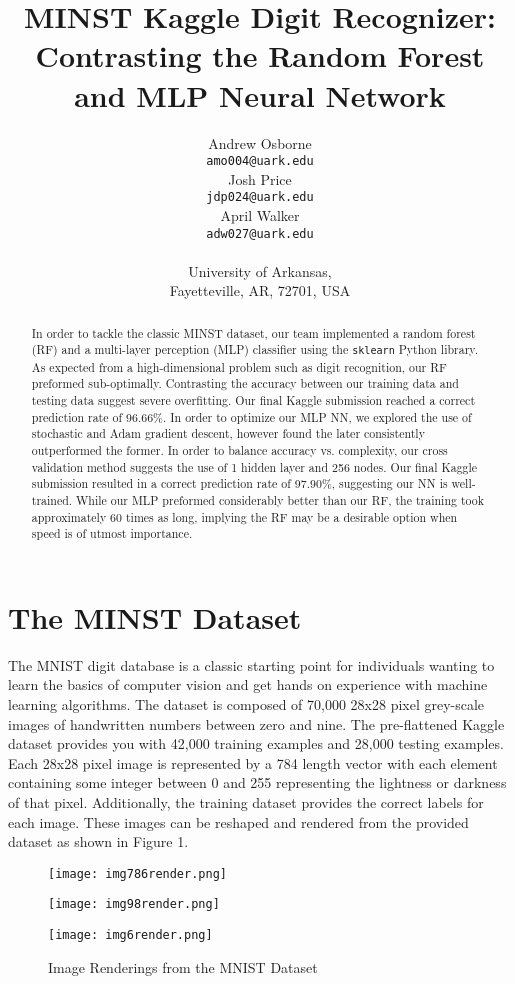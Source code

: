 \documentclass{article}
\title{MINST Kaggle Digit Recognizer: Contrasting the Random Forest and MLP Neural Network}
\author{%
   Andrew Osborne \\
   \texttt{amo004@uark.edu} \\
   \And
   Josh Price \\
   \texttt{jdp024@uark.edu} \\
   \AND
   April Walker \\
   \texttt{adw027@uark.edu} \\
   \\
   University of Arkansas, \\
   Fayetteville, AR, 72701, USA
}
\begin{document}

\maketitle

\begin{abstract}
  In order to tackle the classic MINST dataset, our team implemented a random forest (RF) and a multi-layer perception (MLP) classifier using the \verb+sklearn+ Python library. As expected from a high-dimensional problem such as digit recognition, our RF preformed sub-optimally. Contrasting the accuracy between our training data and testing data suggest severe overfitting. Our final Kaggle submission reached a correct prediction rate of 96.66\%. In order to optimize our MLP NN, we explored the use of stochastic and Adam gradient descent, however found the later consistently outperformed the former. In order to balance accuracy vs. complexity, our cross validation method suggests the use of 1 hidden layer and 256 nodes. Our final Kaggle submission resulted in a correct prediction rate of 97.90\%, suggesting our NN is well-trained. While our MLP preformed considerably better than our RF, the training took approximately 60 times as long, implying the RF may be a desirable option when speed is of utmost importance. 
\end{abstract}

\section{The MINST Dataset}
The MNIST digit database is a classic starting point for individuals wanting to learn the basics of computer vision and get hands on experience with machine learning algorithms. The dataset is composed of 70,000 28x28 pixel grey-scale images of handwritten numbers between zero and nine. The pre-flattened Kaggle dataset provides you with 42,000 training examples and 28,000 testing examples. Each 28x28 pixel image is represented by a 784 length vector with each element containing some integer between 0 and 255 representing the lightness or darkness of that pixel. Additionally, the training dataset provides the correct labels for each image. These images can be reshaped and rendered from the provided dataset as shown in Figure 1. 
\begin{figure}[h]
  \centering
    \begin{minipage}[t]{0.3\textwidth}
        \texttt{[image: img786render.png]}
    \end{minipage}
    \begin{minipage}[t]{0.3\textwidth}
        \texttt{[image: img98render.png]}
    \end{minipage}
    \begin{minipage}[t]{0.3\textwidth}
        \texttt{[image: img6render.png]}
    \end{minipage}
  \caption{Image Renderings from the MNIST Dataset}
\end{figure}
\end{document}

